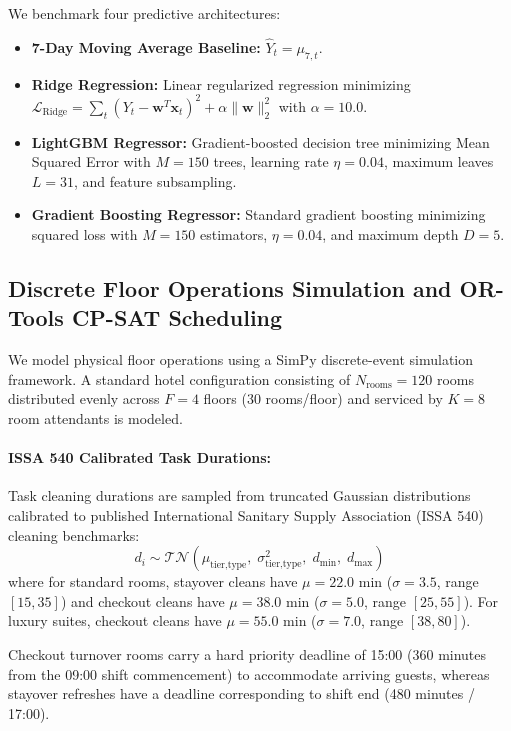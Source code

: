 \documentclass[11pt,a4paper]{article}
\begin{document}
We benchmark four predictive architectures:
\begin{itemize}
    \item \textbf{7-Day Moving Average Baseline:} $\hat{Y}_t = \mu_{7, t}$.
    \item \textbf{Ridge Regression:} Linear regularized regression minimizing $\mathcal{L}_{\text{Ridge}} = \sum_{t} (Y_t - \mathbf{w}^T \mathbf{x}_t)^2 + \alpha \|\mathbf{w}\|_2^2$ with $\alpha = 10.0$.
    \item \textbf{LightGBM Regressor:} Gradient-boosted decision tree minimizing Mean Squared Error with $M=150$ trees, learning rate $\eta = 0.04$, maximum leaves $L = 31$, and feature subsampling.
    \item \textbf{Gradient Boosting Regressor:} Standard gradient boosting minimizing squared loss with $M=150$ estimators, $\eta = 0.04$, and maximum depth $D = 5$.
\end{itemize}

\subsection{Discrete Floor Operations Simulation and OR-Tools CP-SAT Scheduling}
We model physical floor operations using a SimPy discrete-event simulation framework. A standard hotel configuration consisting of $N_{\text{rooms}} = 120$ rooms distributed evenly across $F = 4$ floors (30 rooms/floor) and serviced by $K = 8$ room attendants is modeled. 

\paragraph{ISSA 540 Calibrated Task Durations:} Task cleaning durations are sampled from truncated Gaussian distributions calibrated to published International Sanitary Supply Association (ISSA 540) cleaning benchmarks:
\begin{equation}
d_{i} \sim \mathcal{TN}\left(\mu_{\text{tier}, \text{type}}, \; \sigma^2_{\text{tier}, \text{type}}, \; d_{\min}, \; d_{\max}\right)
\end{equation}
where for standard rooms, stayover cleans have $\mu = 22.0$ min ($\sigma = 3.5$, range $[15, 35]$) and checkout cleans have $\mu = 38.0$ min ($\sigma = 5.0$, range $[25, 55]$). For luxury suites, checkout cleans have $\mu = 55.0$ min ($\sigma = 7.0$, range $[38, 80]$). 

Checkout turnover rooms carry a hard priority deadline of 15:00 (360 minutes from the 09:00 shift commencement) to accommodate arriving guests, whereas stayover refreshes have a deadline corresponding to shift end (480 minutes / 17:00).
\end{document}
